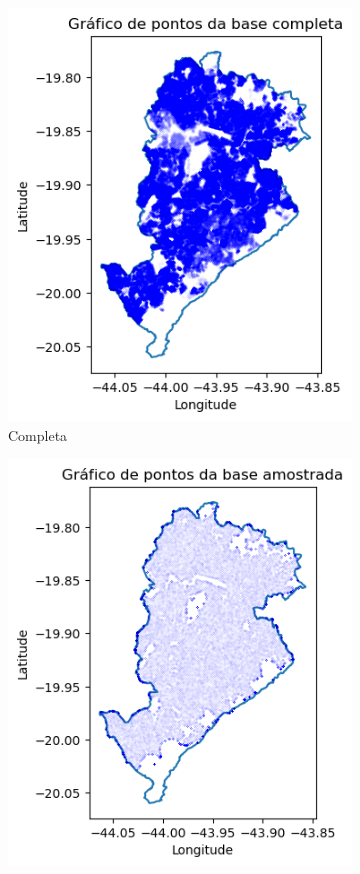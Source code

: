 \begin{figure}[ht]
    \centering
    \begin{subfigure}[b]{0.45\textwidth}
      \includegraphics[width=\textwidth]{Figuras/bhCompleta.png}
      \caption{Completa}
      \label{fig:baseBhC}
    \end{subfigure}
    \hfill
    \begin{subfigure}[b]{0.45\textwidth}
      \includegraphics[width=\textwidth]{Figuras/bhAmostra.png}

\end{subfigure}
\end{figure}
